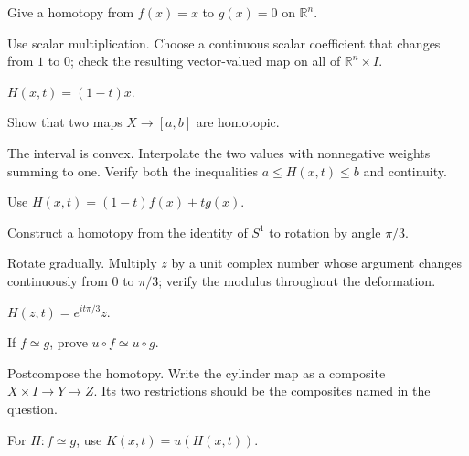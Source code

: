 \begin{exercise}\label{exr:viii01-06}
Give a homotopy from \(f(x)=x\) to \(g(x)=0\) on \(\mathbb R^n\).
\end{exercise}
\begin{hint}Use scalar multiplication.
Choose a continuous scalar coefficient that changes from \(1\) to \(0\); check the resulting vector-valued map on all of \(\mathbb R^n\times I\).
\end{hint}
\begin{solution}
\(H(x,t)=(1-t)x\).
\end{solution}

\begin{exercise}\label{exr:viii01-07}
Show that two maps \(X\to[a,b]\) are homotopic.
\end{exercise}
\begin{hint}The interval is convex.
Interpolate the two values with nonnegative weights summing to one. Verify both the inequalities \(a\le H(x,t)\le b\) and continuity.
\end{hint}
\begin{solution}
Use \(H(x,t)=(1-t)f(x)+tg(x)\).
\end{solution}

\begin{exercise}\label{exr:viii01-08}
Construct a homotopy from the identity of \(S^1\) to rotation by angle \(\pi/3\).
\end{exercise}
\begin{hint}Rotate gradually.
Multiply \(z\) by a unit complex number whose argument changes continuously from \(0\) to \(\pi/3\); verify the modulus throughout the deformation.
\end{hint}
\begin{solution}
\(H(z,t)=e^{it\pi/3}z\).
\end{solution}

\begin{exercise}\label{exr:viii01-09}
If \(f\simeq g\), prove \(u\circ f\simeq u\circ g\).
\end{exercise}
\begin{hint}Postcompose the homotopy.
Write the cylinder map as a composite \(X\times I\to Y\to Z\). Its two restrictions should be the composites named in the question.
\end{hint}
\begin{solution}
For \(H:f\simeq g\), use \(K(x,t)=u(H(x,t))\).
\end{solution}

